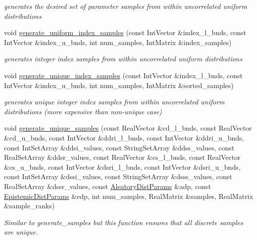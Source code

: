 \begin{DoxyCompactItemize}
\begin{DoxyCompactList}\small\item\em generates the desired set of parameter samples from within uncorrelated uniform distributions \end{DoxyCompactList}\item 
void \hyperlink{classPecos_1_1LHSDriver_aee047994918369381f1f07bb0635d722}{generate\+\_\+uniform\+\_\+index\+\_\+samples} (const Int\+Vector \&index\+\_\+l\+\_\+bnds, const Int\+Vector \&index\+\_\+u\+\_\+bnds, int num\+\_\+samples, Int\+Matrix \&index\+\_\+samples)\label{classPecos_1_1LHSDriver_aee047994918369381f1f07bb0635d722}

\begin{DoxyCompactList}\small\item\em generates integer index samples from within uncorrelated uniform distributions \end{DoxyCompactList}\item 
void \hyperlink{classPecos_1_1LHSDriver_aef441ba078058c664fd1674840f8a313}{generate\+\_\+unique\+\_\+index\+\_\+samples} (const Int\+Vector \&index\+\_\+l\+\_\+bnds, const Int\+Vector \&index\+\_\+u\+\_\+bnds, int num\+\_\+samples, Int\+Matrix \&sorted\+\_\+samples)\label{classPecos_1_1LHSDriver_aef441ba078058c664fd1674840f8a313}

\begin{DoxyCompactList}\small\item\em generates unique integer index samples from within uncorrelated uniform distributions (more expensive than non-\/unique case) \end{DoxyCompactList}\item 
void \hyperlink{classPecos_1_1LHSDriver_abd371874beed602dd10eab53fd1a70c0}{generate\+\_\+unique\+\_\+samples} (const Real\+Vector \&cd\+\_\+l\+\_\+bnds, const Real\+Vector \&cd\+\_\+u\+\_\+bnds, const Int\+Vector \&ddri\+\_\+l\+\_\+bnds, const Int\+Vector \&ddri\+\_\+u\+\_\+bnds, const Int\+Set\+Array \&ddsi\+\_\+values, const String\+Set\+Array \&ddss\+\_\+values, const Real\+Set\+Array \&ddsr\+\_\+values, const Real\+Vector \&cs\+\_\+l\+\_\+bnds, const Real\+Vector \&cs\+\_\+u\+\_\+bnds, const Int\+Vector \&dsri\+\_\+l\+\_\+bnds, const Int\+Vector \&dsri\+\_\+u\+\_\+bnds, const Int\+Set\+Array \&dssi\+\_\+values, const String\+Set\+Array \&dsss\+\_\+values, const Real\+Set\+Array \&dssr\+\_\+values, const \hyperlink{classPecos_1_1AleatoryDistParams}{Aleatory\+Dist\+Params} \&adp, const \hyperlink{classPecos_1_1EpistemicDistParams}{Epistemic\+Dist\+Params} \&edp, int num\+\_\+samples, Real\+Matrix \&samples, Real\+Matrix \&sample\+\_\+ranks)\label{classPecos_1_1LHSDriver_abd371874beed602dd10eab53fd1a70c0}

\begin{DoxyCompactList}\small\item\em Similar to generate\+\_\+samples but this function ensures that all discrete samples are unique. \end{DoxyCompactList}\end{DoxyCompactItemize}
